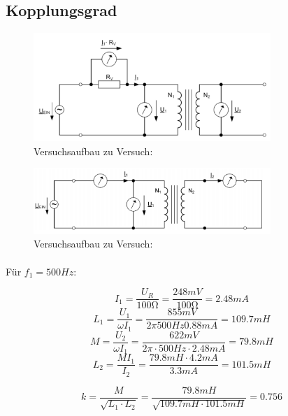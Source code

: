 \documentclass[a4paper]{article}
\begin{document}
\subsection{Kopplungsgrad}
\label{subsec:Versuch3-Kopplungsgrad}

\begin{figure}[H]
    \centering
    \includegraphics[width=0.8\textwidth]{versuchsaufbau-3-kopplungsgrad.png}
    \caption[Schaltplan]{Versuchsaufbau zu Versuch: }
    \label{fig:3-versuchsaufbau-kopplungsgrad}
\end{figure}

\begin{figure}[H]
    \centering
    \includegraphics[width=0.8\textwidth]{versuchsaufbau-3-kurzschluss.png}
    \caption[Schaltplan]{Versuchsaufbau zu Versuch: }
    \label{fig:3-versuchsaufbau-kurzschluss}
\end{figure}

\paragraph{}
Für $f_1=500\si{Hz}$:

$$I_1=\frac{U_R}{100\si{\ohm}}=\frac{248\si{mV}}{100\si{\ohm}}=2.48\si{mA}$$
$$L_1=\frac{U_1}{\omega I_1}=\frac{855\si{mV}}{2 \pi 500\si{Hz} 0.88\si{mA}}=109.7\si{mH}$$
$$M=\frac{U_2}{\omega I_1}=\frac{622\si{mV}}{2 \pi \cdot 500\si{Hz} \cdot 2.48\si{mA}}=79.8\si{mH}$$
$$L_2=\frac{M I_1}{I_2}=\frac{79.8\si{mH} \cdot 4.2\si{mA}}{3.3\si{mA}}=101.5\si{mH}$$

$$k=\frac{M}{\sqrt{L_1\cdot L_2}}=\frac{79.8\si{mH}}{\sqrt{109.7\si{mH} \cdot 101.5\si{mH}}} = 0.756$$
\end{document}
